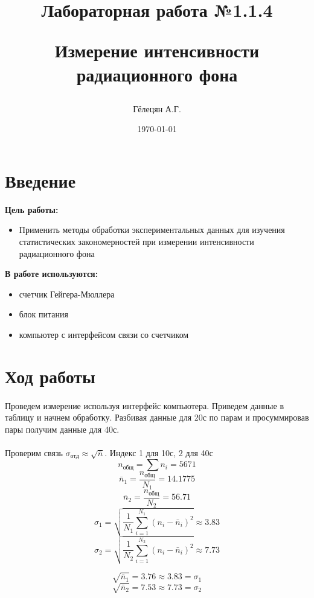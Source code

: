 \documentclass[a4paper, 12pt]{article}
\title{\begin{center}Лабораторная работа №1.1.4\end{center}
Измерение интенсивности радиационного фона}
\author{Гёлецян А.Г.}
\date{\today}
\begin{document}
    \maketitle
    \newpage

    \section{Введение}
    \textbf{Цель работы:}
    \begin{itemize}
        \item Применить методы обработки экспериментальных данных для изучения статистических закономерностей при измерении интенсивности радиационного фона
    \end{itemize}

    \vspace{1cm}

    \textbf{В работе используются: }
    \begin{itemize}
        \item счетчик Гейгера-Мюллера
        \item блок питания
        \item компьютер с интерфейсом связи со счетчиком

    \end{itemize}

    \section{Ход работы}
    \paragraph{}
    Проведем измерение используя интерфейс компьютера. Приведем данные в таблицу и начнем  обработку. Разбивая данные для 20с по парам и просуммировав пары получим данные для 40с.
    \paragraph{}
    Проверим связь $\sigma_{отд}\approx \sqrt{\bar{n}}$. Индекс 1 для 10с, 2 для 40с
    \[n_{общ} = \sum n_i = 5671\]
    \[\bar{n}_1 = \frac{n_{общ}}{N_1} = 14.1775\]
    \[\bar{n}_2 = \frac{n_{общ}}{N_2} = 56.71\]
    \[\sigma_{1}=\sqrt{\frac{1}{N_1} \sum_{i=1}^{N_1} (n_i - \bar{n}_i)^2} \approx 3.83\]
    \[\sigma_{2}=\sqrt{\frac{1}{N_2} \sum_{i=1}^{N_2} (n_i - \bar{n}_i)^2} \approx 7.73\]
    \newpage

    \[\sqrt{\bar{n}_1} =3.76 \approx 3.83 = \sigma_1\]
    \[\sqrt{\bar{n}_2} =7.53 \approx 7.73 = \sigma_2\]
\end{document}
